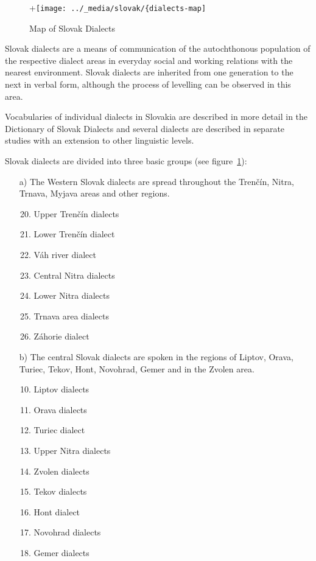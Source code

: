 \begin{multicols}{2}
\begin{figure}[ht]
\centering
+\texttt{[image: ../\_media/slovak/\{dialects-map]}
\caption{%
Map of Slovak Dialects
}
\label{fig:dialects_en}
\end{figure}

Slovak dialects are a means of communication of the autochthonous population of the respective dialect areas in everyday social and working relations with the nearest environment. Slovak dialects are inherited from one generation to the next in verbal form, although the process of levelling can be observed in this area. 

Vocabularies of individual dialects in Slovakia are described in more detail in the Dictionary of Slovak Dialects and several dialects are described in separate studies with an extension to other linguistic levels.

Slovak dialects are divided into three basic groups (see figure~\ref{fig:dialects_en}):

\begin{itemize}

\item[a)] The Western Slovak dialects are spread throughout the Trenčín, Nitra, Trnava, Myjava areas and other regions.

\begin{enumerate}
\setcounter{enumi}{19}
\item Upper Trenčín dialects
\item Lower Trenčín dialect
\item Váh river dialect
\item Central Nitra dialects
\item Lower Nitra dialects
\item Trnava area dialects
\item Záhorie dialect
\end{enumerate}

\item[b)] The central Slovak dialects are spoken in the regions of Liptov, Orava, Turiec, Tekov, Hont, Novohrad, Gemer and in the Zvolen area.

\begin{enumerate}
\setcounter{enumi}{9}
\item Liptov dialects
\item Orava dialects
\item Turiec dialect
\item Upper Nitra dialects
\item Zvolen dialects
\item Tekov dialects
\item Hont dialect
\item Novohrad dialects
\item Gemer dialects
\end{enumerate}


\end{itemize}
\end{multicols}
